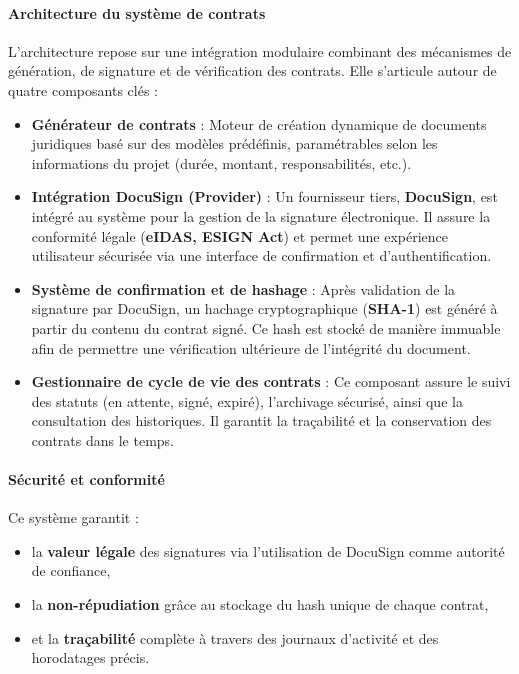 \paragraph{Architecture du système de contrats}
L'architecture repose sur une intégration modulaire combinant des mécanismes de génération, de signature et de vérification des contrats. Elle s'articule autour de quatre composants clés :

\begin{itemize}
    \item \textbf{Générateur de contrats} : Moteur de création dynamique de documents juridiques basé sur des modèles prédéfinis, paramétrables selon les informations du projet (durée, montant, responsabilités, etc.).

    \item \textbf{Intégration \textbf{DocuSign} (Provider)} : Un fournisseur tiers, \textbf{DocuSign}, est intégré au système pour la gestion de la signature électronique. Il assure la conformité légale (\textbf{eIDAS, ESIGN Act}) et permet une expérience utilisateur sécurisée via une interface de confirmation et d'authentification.

    \item \textbf{Système de confirmation et de hashage} : Après validation de la signature par DocuSign, un hachage cryptographique (\textbf{SHA-1}) est généré à partir du contenu du contrat signé. Ce hash est stocké de manière immuable afin de permettre une vérification ultérieure de l'intégrité du document.

    \item \textbf{Gestionnaire de cycle de vie des contrats} : Ce composant assure le suivi des statuts (en attente, signé, expiré), l'archivage sécurisé, ainsi que la consultation des historiques. Il garantit la traçabilité et la conservation des contrats dans le temps.
\end{itemize}

\paragraph{Sécurité et conformité}
Ce système garantit :
\begin{itemize}
    \item la \textbf{valeur légale} des signatures via l'utilisation de DocuSign comme autorité de confiance,
    \item la \textbf{non-répudiation} grâce au stockage du hash unique de chaque contrat,
    \item et la \textbf{traçabilité} complète à travers des journaux d'activité et des horodatages précis.
\end{itemize}


